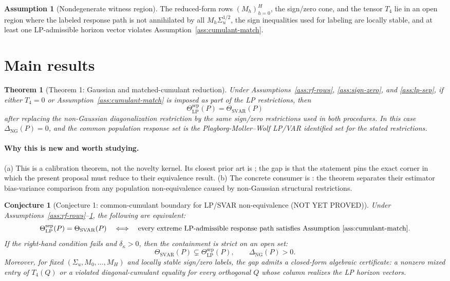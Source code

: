 \documentclass[11pt]{article}
\theoremstyle{definition}
\newtheorem{assumption}{Assumption}
\theoremstyle{plain}
\newtheorem{theorem}{Theorem}
\newtheorem{conjecture}{Conjecture}
\theoremstyle{remark}
\begin{document}
\begin{assumption}[Nondegenerate witness region]\label{ass:witness-region}
The reduced-form rows \((M_h)_{h=0}^H\), the sign/zero cone, and the tensor \(T_4\) lie in an open region where the labeled response path is not annihilated by all \(M_h\Sigma_u^{1/2}\), the sign inequalities used for labeling are locally stable, and at least one LP-admissible horizon vector violates Assumption~\ref{ass:cumulant-match}.
\end{assumption}

\section{Main results}
\begin{theorem}[Theorem 1: Gaussian and matched-cumulant reduction]\label{thm:gaussian-reduction}
Under Assumptions~\ref{ass:rf-rows}, \ref{ass:sign-zero}, and \ref{ass:lp-sep}, if either \(T_4=0\) or Assumption~\ref{ass:cumulant-match} is imposed as part of the LP restrictions, then
\[
\Theta_{\mathrm{LP}}^{\mathrm{sep}}(P)=\Theta_{\mathrm{SVAR}}(P)
\]
after replacing the non-Gaussian diagonalization restriction by the same sign/zero restrictions used in both procedures.  In this case \(\Delta_{\mathrm{NG}}(P)=0\), and the common population response set is the Plagborg-Moller--Wolf LP/VAR identified set for the stated restrictions.
\end{theorem}
\paragraph{Why this is new and worth studying.}
(a) This is a calibration theorem, not the novelty kernel.  Its closest prior art is \citet{PlagborgMollerWolf2021}; the gap is that the statement pins the exact corner in which the present proposal must reduce to their equivalence result.  (b) The concrete consumer is \citet{LiPlagborgMollerWolf2024}: the theorem separates their estimator bias-variance comparison from any population non-equivalence caused by non-Gaussian structural restrictions.

\begin{conjecture}[Conjecture 1: common-cumulant boundary for LP/SVAR non-equivalence (NOT YET PROVED)]\label{conj:common-cumulant-boundary}
Under Assumptions~\ref{ass:rf-rows}--\ref{ass:witness-region}, the following are equivalent:
\[
\Theta_{\mathrm{LP}}^{\mathrm{sep}}(P)=\Theta_{\mathrm{SVAR}}(P)
\quad\Longleftrightarrow\quad
\text{every extreme LP-admissible response path satisfies Assumption~\ref{ass:cumulant-match}.}
\]
If the right-hand condition fails and \(\delta_\kappa>0\), then the containment is strict on an open set:
\[
\Theta_{\mathrm{SVAR}}(P)\subsetneq\Theta_{\mathrm{LP}}^{\mathrm{sep}}(P),
\qquad
\Delta_{\mathrm{NG}}(P)>0.
\]
Moreover, for fixed \((\Sigma_u,M_0,\ldots,M_H)\) and locally stable sign/zero labels, the gap admits a closed-form algebraic certificate: a nonzero mixed entry of \(T_4(Q)\) or a violated diagonal-cumulant equality for every orthogonal \(Q\) whose column realizes the LP horizon vectors.
\end{conjecture}
\end{document}
